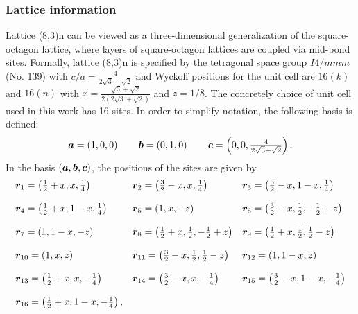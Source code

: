\subsubsection{Lattice information}
%
%
Lattice (8,3)n can be viewed as a three-dimensional generalization of the square-octagon lattice, where layers of square-octagon lattices are coupled via mid-bond sites.
Formally, lattice (8,3)n is specified by the tetragonal space group $I4/mmm$ (No. 139) with $c/a = \frac{4}{2\sqrt{3} + \sqrt{2}}$ and Wyckoff positions for the unit cell are $16(k)$ and $16(n)$ with $x = \frac{\sqrt{3} + \sqrt{2}}{2(2\sqrt{3} + \sqrt{2})}$ and $z=1/8$.
The concretely choice of unit cell used in this work has 16 sites.
In order to simplify notation, the following basis is defined:
%
\begin{equation}
	\begin{matrix*}[l]
		\ba = \left(1, 0, 0\right) \qquad
		\bb = \left(0, 1, 0\right) \qquad
		\bc = \left(0, 0, \frac{4}{2\sqrt{3} + \sqrt{2}}\right).
	\end{matrix*}
\end{equation}
%
In the basis $(\bm{a}, \bm{b}, \bm{c})$, the positions of the sites are given by%
%
\begin{equation}
	\begin{matrix*}[l]
		\br_{1} = \left(\frac{1}{2} + x, x, \frac{1}{4} \right) &
		\br_{2} = \left(\frac{3}{2} - x, x, \frac{1}{4} \right) &
		\br_{3} = \left(\frac{3}{2} - x, 1 - x, \frac{1}{4} \right) \\
		&\\
		\br_{4} = \left(\frac{1}{2} + x, 1 - x, \frac{1}{4} \right) &
		\br_{5} = \left(1, x, -z \right) &
		\br_{6} = \left(\frac{3}{2} - x, \frac{1}{2}, -\frac{1}{2} + z \right) \\
		&\\
		\br_{7} = \left(1, 1 - x, -z \right) &
		\br_{8} = \left(\frac{1}{2} + x, \frac{1}{2}, -\frac{1}{2} + z \right) &
		\br_{9} = \left(\frac{1}{2} + x, \frac{1}{2}, \frac{1}{2} - z \right) \\
		&\\
		\br_{10} = \left(1, x, z \right) &
		\br_{11} = \left(\frac{3}{2} - x, \frac{1}{2}, \frac{1}{2} - z \right) &
		\br_{12} = \left(1, 1-x, z \right) \\
		&\\
		\br_{13} = \left(\frac{1}{2} + x, x, -\frac{1}{4} \right) &
		\br_{14} = \left(\frac{3}{2} - x, x, -\frac{1}{4} \right) &
		\br_{15} = \left(\frac{3}{2} -x, 1 - x, -\frac{1}{4} \right) \\
		&\\
		\br_{16} = \left(\frac{1}{2} + x, 1 - x, -\frac{1}{4} \right),
	\end{matrix*}
\end{equation}
